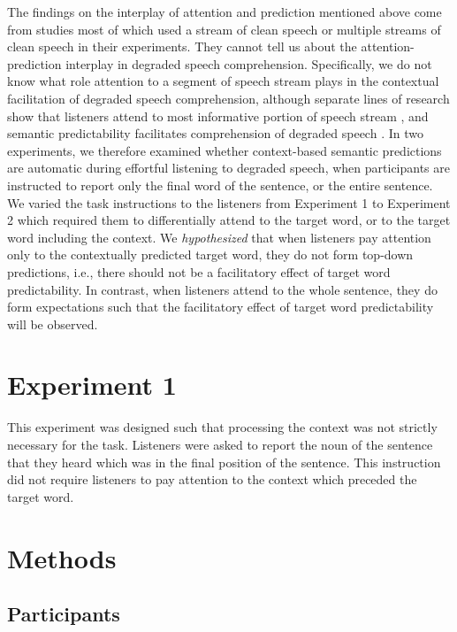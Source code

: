 \documentclass[a4paper, nobind]{templates/ociamthesis}
\begin{document}
The findings on the interplay of attention and prediction mentioned above come from studies most of which used a stream of clean speech or multiple streams of clean speech in their experiments.
They cannot tell us about the attention-prediction interplay in degraded speech comprehension.
Specifically, we do not know what role attention to a segment of speech stream plays in the contextual facilitation of degraded speech comprehension,
although separate lines of research show that listeners attend to most informative portion of speech stream \autocite[e.g.,][]{Astheimer2011}, and semantic predictability facilitates comprehension of degraded speech \autocite[e.g.,][]{Obleser2010}.
In two experiments, we therefore examined whether context-based semantic predictions are automatic during effortful listening to degraded speech, when participants are instructed to report only the final word of the sentence, or the entire sentence.
We varied the task instructions to the listeners from Experiment 1 to Experiment 2 which required them to differentially attend to the target word, or to the target word including the context.
We \emph{hypothesized} that when listeners pay attention only to the contextually predicted target word, they do not form top-down predictions, i.e., there should not be a facilitatory effect of target word predictability.
In contrast, when listeners attend to the whole sentence, they do form expectations such that the facilitatory effect of target word predictability will be observed.

\hypertarget{experiment-1}{%
\section{Experiment 1}\label{experiment-1}}

This experiment was designed such that processing the context was not strictly necessary for the task.
Listeners were asked to report the noun of the sentence that they heard which was in the final position of the sentence.
This instruction did not require listeners to pay attention to the context which preceded the target word.

\hypertarget{methods}{%
\section{Methods}\label{methods}}

\hypertarget{participants}{%
\subsection{Participants}\label{participants}}
\end{document}
